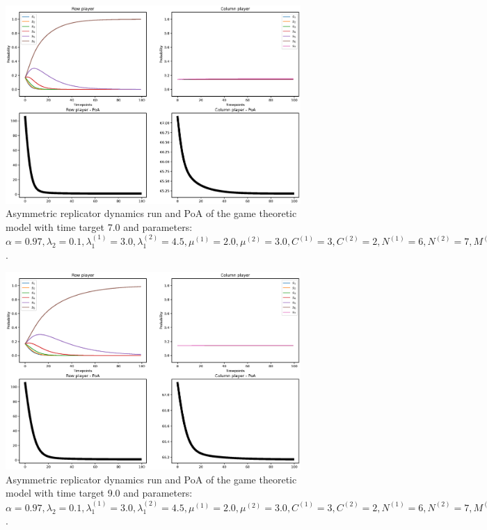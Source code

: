 \begin{figure}[H]
    \includegraphics[width=\textwidth, trim = 0 60 0 60, clip]{chapters/00_appendix/02_more_game_results/Bin/poa_ard_target_7.eps}
    \caption{Asymmetric replicator dynamics run and PoA of the game theoretic
    model with time target 7.0 and parameters: \(\alpha = 0.97,
    \lambda_2 = 0.1, \lambda_1^{(1)} = 3.0, \lambda_1^{(2)} = 4.5,
    \mu^{(1)} = 2.0, \mu^{(2)} = 3.0, C^{(1)} = 3, C^{(2)} = 2,
    N^{(1)} = 6, N^{(2)} = 7, M^{(1)} = 5, M^{(2)} = 4\).}
    \label{fig:poa_ard_target_7}
\end{figure}

\begin{figure}[H]
    \includegraphics[width=\textwidth, trim = 0 60 0 60, clip]{chapters/00_appendix/02_more_game_results/Bin/poa_ard_target_9.eps}
    \caption{Asymmetric replicator dynamics run and PoA of the game theoretic
    model with time target 9.0 and parameters: \(\alpha = 0.97,
    \lambda_2 = 0.1, \lambda_1^{(1)} = 3.0, \lambda_1^{(2)} = 4.5,
    \mu^{(1)} = 2.0, \mu^{(2)} = 3.0, C^{(1)} = 3, C^{(2)} = 2,
    N^{(1)} = 6, N^{(2)} = 7, M^{(1)} = 5, M^{(2)} = 4\).}
    \label{fig:poa_ard_target_9}
\end{figure}


